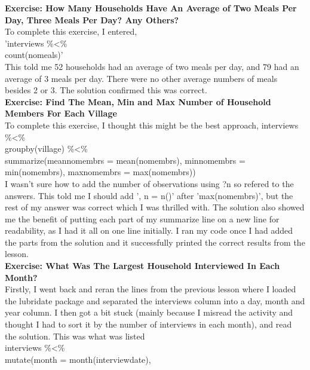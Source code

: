 \documentclass{article}
\begin{document}
\begin{FlushLeft}
\textbf{Exercise: How Many Households Have An Average of Two Meals Per Day, Three Meals Per Day? Any Others?}\\ 
To complete this exercise, I entered,\\
'interviews \%\textless\%\\
count(no\textunderscore meals)'\\
This told me 52 households had an average of two meals per day, and 79 had an average of 3 meals per day. There were no other average numbers of meals besides 2 or 3. The solution confirmed this was correct.\\
\vspace{5mm}
\textbf{Exercise: Find The Mean, Min and Max Number of Household Members For Each Village}\\ 
To complete this exercise, I thought this might be the best approach,
interviews \%\textless\%\\
group\textunderscore by(village) \%\textless\%\\
summarize(mean\textunderscore no\textunderscore membrs = mean(no\textunderscore membrs), min\textunderscore no\textunderscore membrs = min(no\textunderscore membrs),
max\textunderscore no\textunderscore membrs = max(no\textunderscore membrs))\\
I wasn't sure how to add the number of observations using ?n so refered to the answers. This told me I should add ', n = n()' after 'max(no\textunderscore membrs)', but the rest of my answer was correct which I was thrilled with. The solution also showed me the benefit of putting each part of my summarize line on a new line for readability, as I had it all on one line initially. I ran my code once I had added the parts from the solution and it successfully printed the correct results from the lesson.\\
\vspace{5mm}
\textbf{Exercise: What Was The Largest Household Interviewed In Each Month?}\\ 
Firstly, I went back and reran the lines from the previous lesson where I loaded the lubridate package and separated the interviews column into a day, month and year column. I then got a bit stuck (mainly because I misread the activity and thought I had to sort it by the number of interviews in each month), and read the solution. This was what was listed\\
interviews \%\textless\%\\
mutate(month = month(interview\textunderscore date),\\

\end{FlushLeft}
\end{document}
